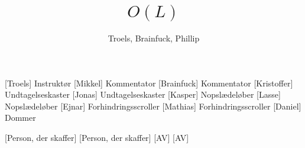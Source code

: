 \documentclass[a4paper,11pt]{article}
\title{$O(L)$}
\author{Troels, Brainfuck, Phillip}
\begin{document}
\maketitle

\begin{roles}
  [Troels] Instruktør
  [Mikkel] Kommentator
  [Brainfuck] Kommentator
  [Kristoffer] Undtagelseskaster
  [Jonas] Undtagelseskaster
  [Kasper] Nopslædeløber
  [Lasse] Nopslædeløber
  [Ejnar] Forhindringsscroller
  [Mathias] Forhindringsscroller
  [Daniel] Dommer
\end{roles}

\begin{props}
  [Person, der skaffer]
  [Person, der skaffer]
  [AV]
  [AV]
\end{props}
\end{document}
